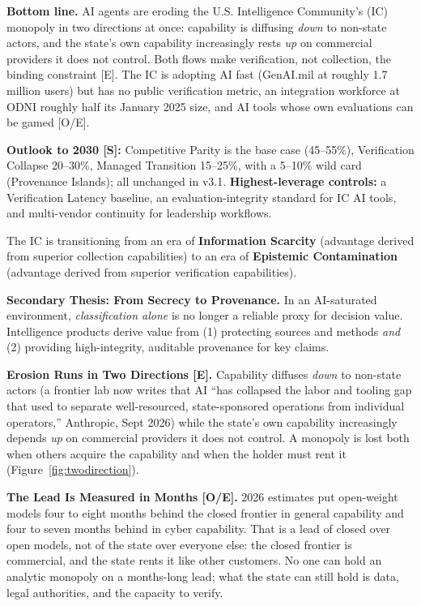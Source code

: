 \documentclass[11pt,letterpaper]{article}
\begin{document}
\begin{tcolorbox}[enhanced, colback=lightgray, colframe=slatemid!50, boxrule=1pt, arc=3pt,
  left=10pt, right=10pt, top=10pt, bottom=10pt]
\textbf{Bottom line.} AI agents are eroding the U.S. Intelligence Community's (IC) monopoly in two directions at once: capability is diffusing \textit{down} to non-state actors, and the state's own capability increasingly rests \textit{up} on commercial providers it does not control. Both flows make verification, not collection, the binding constraint [E]. The IC is adopting AI fast (GenAI.mil at roughly 1.7 million users) but has no public verification metric, an integration workforce at ODNI roughly half its January 2025 size, and AI tools whose own evaluations can be gamed [O/E].

\textbf{Outlook to 2030 [S]:} Competitive Parity is the base case (45--55\%), Verification Collapse 20--30\%, Managed Transition 15--25\%, with a 5--10\% wild card (Provenance Islands); all unchanged in v3.1. \textbf{Highest-leverage controls:} a Verification Latency baseline, an evaluation-integrity standard for IC AI tools, and multi-vendor continuity for leadership workflows.
\end{tcolorbox}

\vspace{0.2cm}

\begin{keybox}
The IC is transitioning from an era of \textbf{Information Scarcity} (advantage derived from superior collection capabilities) to an era of \textbf{Epistemic Contamination} (advantage derived from superior verification capabilities).

\textbf{Secondary Thesis: From Secrecy to Provenance.} In an AI-saturated environment, \textit{classification alone} is no longer a reliable proxy for decision value. Intelligence products derive value from (1) protecting sources and methods \textit{and} (2) providing high-integrity, auditable provenance for key claims.

\textbf{Erosion Runs in Two Directions [E].} Capability diffuses \textit{down} to non-state actors (a frontier lab now writes that AI ``has collapsed the labor and tooling gap that used to separate well-resourced, state-sponsored operations from individual operators,'' Anthropic, Sept 2026) while the state's own capability increasingly depends \textit{up} on commercial providers it does not control. A monopoly is lost both when others acquire the capability and when the holder must rent it (Figure~\ref{fig:twodirection}).

\textbf{The Lead Is Measured in Months [O/E].} 2026 estimates put open-weight models four to eight months behind the closed frontier in general capability and four to seven months behind in cyber capability. That is a lead of closed over open models, not of the state over everyone else: the closed frontier is commercial, and the state rents it like other customers. No one can hold an analytic monopoly on a months-long lead; what the state can still hold is data, legal authorities, and the capacity to verify.
\end{keybox}
\end{document}
